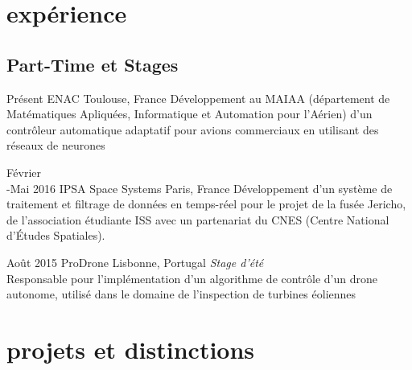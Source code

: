 \documentclass[]{friggeri-cv} %
\begin{document}

\section{expérience}


\subsection{Part-Time et Stages}

\begin{entrylist}
\entry
{Présent}
{ENAC}
{Toulouse, France}
{Développement au MAIAA (département de Matématiques Apliquées, Informatique et Automation pour l'Aérien) d'un contrôleur automatique adaptatif pour avions commerciaux en utilisant des réseaux de neurones}



\entry
{Février\\-Mai 2016}
{IPSA Space Systems}
{Paris, France}
{Développement d'un système de traitement et filtrage de données en temps-réel pour le projet de la fusée Jericho, de l'association étudiante ISS avec un partenariat du CNES (Centre National d'Études Spatiales).}


\entry
{Août 2015}
{ProDrone}
{Lisbonne, Portugal}
{\emph{Stage d'été} \\
Responsable pour l'implémentation d'un algorithme de contrôle d'un drone autonome, utilisé dans le domaine de l'inspection de turbines éoliennes}



\end{entrylist}


\section{projets et distinctions}
\end{document}
